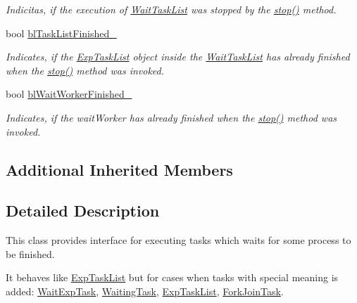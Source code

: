 \begin{DoxyCompactItemize}
\begin{DoxyCompactList}\small\item\em Indicitas, if the execution of \hyperlink{class_wait_task_list}{Wait\+Task\+List} was stopped by the \hyperlink{class_wait_task_list_acffb5d311033d065e2b5889a0c51f3f1}{stop()} method. \end{DoxyCompactList}\item 
\hypertarget{class_wait_task_list_a50d68d7fddb9cbdc87e9c566f10ee14e}{}bool \hyperlink{class_wait_task_list_a50d68d7fddb9cbdc87e9c566f10ee14e}{bl\+Task\+List\+Finished\+\_\+}\label{class_wait_task_list_a50d68d7fddb9cbdc87e9c566f10ee14e}

\begin{DoxyCompactList}\small\item\em Indicates, if the \hyperlink{class_exp_task_list}{Exp\+Task\+List} object inside the \hyperlink{class_wait_task_list}{Wait\+Task\+List} has already finished when the \hyperlink{class_wait_task_list_acffb5d311033d065e2b5889a0c51f3f1}{stop()} method was invoked. \end{DoxyCompactList}\item 
\hypertarget{class_wait_task_list_a7c776c15701ac7f1486b392db78a5cec}{}bool \hyperlink{class_wait_task_list_a7c776c15701ac7f1486b392db78a5cec}{bl\+Wait\+Worker\+Finished\+\_\+}\label{class_wait_task_list_a7c776c15701ac7f1486b392db78a5cec}

\begin{DoxyCompactList}\small\item\em Indicates, if the wait\+Worker has already finished when the \hyperlink{class_wait_task_list_acffb5d311033d065e2b5889a0c51f3f1}{stop()} method was invoked. \end{DoxyCompactList}\end{DoxyCompactItemize}
\subsection*{Additional Inherited Members}


\subsection{Detailed Description}
This class provides interface for executing tasks which waits for some process to be finished. 

It behaves like \hyperlink{class_exp_task_list}{Exp\+Task\+List} but for cases when tasks with special meaning is added\+: \hyperlink{class_wait_exp_task}{Wait\+Exp\+Task}, \hyperlink{class_waiting_task}{Waiting\+Task}, \hyperlink{class_exp_task_list}{Exp\+Task\+List}, \hyperlink{class_fork_join_task}{Fork\+Join\+Task}.

